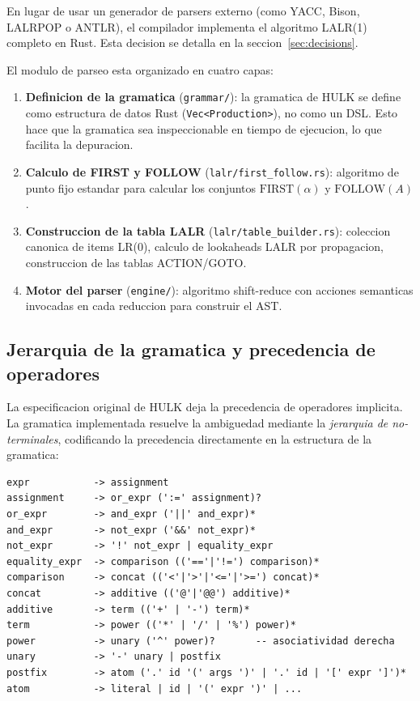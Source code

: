 \documentclass[12pt,a4paper]{article}
\begin{document}
En lugar de usar un generador de parsers externo (como YACC, Bison, LALRPOP o ANTLR),
el compilador implementa el algoritmo LALR(1) completo en Rust. Esta decision se
detalla en la seccion~\ref{sec:decisions}.

El modulo de parseo esta organizado en cuatro capas:

\begin{enumerate}
  \item \textbf{Definicion de la gramatica} (\texttt{grammar/}): la gramatica de HULK
    se define como estructura de datos Rust (\texttt{Vec<Production>}), no como un DSL.
    Esto hace que la gramatica sea inspeccionable en tiempo de ejecucion, lo que
    facilita la depuracion.
  \item \textbf{Calculo de FIRST y FOLLOW} (\texttt{lalr/first\_follow.rs}):
    algoritmo de punto fijo estandar para calcular los conjuntos
    $\text{FIRST}(\alpha)$ y $\text{FOLLOW}(A)$.
  \item \textbf{Construccion de la tabla LALR} (\texttt{lalr/table\_builder.rs}):
    coleccion canonica de items LR(0), calculo de lookaheads LALR por propagacion,
    construccion de las tablas ACTION/GOTO.
  \item \textbf{Motor del parser} (\texttt{engine/}): algoritmo shift-reduce con
    acciones semanticas invocadas en cada reduccion para construir el AST.
\end{enumerate}

\subsection{Jerarquia de la gramatica y precedencia de operadores}

La especificacion original de HULK deja la precedencia de operadores implicita. La
gramatica implementada resuelve la ambiguedad mediante la \textit{jerarquia de
no-terminales}, codificando la precedencia directamente en la estructura de la gramatica:

\begin{lstlisting}[style={}, caption={Jerarquia de precedencias en la gramatica HULK},
  numbers=none]
expr           -> assignment
assignment     -> or_expr (':=' assignment)?
or_expr        -> and_expr ('||' and_expr)*
and_expr       -> not_expr ('&&' not_expr)*
not_expr       -> '!' not_expr | equality_expr
equality_expr  -> comparison (('=='|'!=') comparison)*
comparison     -> concat (('<'|'>'|'<='|'>=') concat)*
concat         -> additive (('@'|'@@') additive)*
additive       -> term (('+' | '-') term)*
term           -> power (('*' | '/' | '%') power)*
power          -> unary ('^' power)?       -- asociatividad derecha
unary          -> '-' unary | postfix
postfix        -> atom ('.' id '(' args ')' | '.' id | '[' expr ']')*
atom           -> literal | id | '(' expr ')' | ...
\end{lstlisting}
\end{document}
